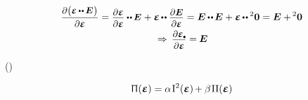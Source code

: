 \nopagebreak\vspace{-0.66em}
\begin{multline}\label{thederivativeoftracebythetensoritself}
\scalebox{.92}{$
   \displaystyle
   \frac{\raisemath{-0.133em}{
      \partial \bigl( \infinitesimaldeformation \hspace{-0.1ex} \dotdotp \hspace{-0.1ex} \UnitDyad \hspace{.1ex} \bigr)
   }}
   { \raisemath{-0.07em}{\partial \infinitesimaldeformation} }
$}
=
\scalebox{.92}{$
   \displaystyle
   \frac{\raisemath{-0.133em}{ \partial \infinitesimaldeformation }}{ \raisemath{-0.07em}{\partial \infinitesimaldeformation} }
   \dotdotp
   \hspace{-0.1ex} \UnitDyad \hspace{.1ex}
$}
+
\infinitesimaldeformation \hspace{-0.2ex}
\dotdotp
\scalebox{.92}{$
   \displaystyle
   \frac{\raisemath{-0.133em}{ \partial \UnitDyad }}{ \raisemath{-0.07em}{\partial \infinitesimaldeformation} }
$}
=
\UnitDyad \hspace{-0.1ex} \dotdotp \hspace{-0.2ex} \UnitDyad
+
\infinitesimaldeformation \hspace{-0.2ex} \dotdotp \hspace{-0.1ex} \zerobivalent
=
\UnitDyad + \hspace{-0.2ex} \zerobivalent
%
\\
%
\hspace{.4ex} \Rightarrow \hspace{.4ex}
%
\scalebox{.92}{$
   \displaystyle
   \frac{\raisemath{-0.133em}{
      \partial \infinitesimaldeformation\tracedot
   }}
   { \raisemath{-0.07em}{\partial \infinitesimaldeformation} }
$}
= \hspace{-0.1ex}
\UnitDyad
\end{multline}

()

\nopagebreak\vspace{-0.2em}
\begin{equation}\label{theelasticpotentialforanisotropicmedium}
\potentialenergydensity(\infinitesimaldeformation) =
\alpha \hspace{.2ex} \anyfirstinvariant^2 (\infinitesimaldeformation) \hspace{-0.2ex}
+ \beta \hspace{.2ex} \anysecondinvariant (\infinitesimaldeformation)
\end{equation}

